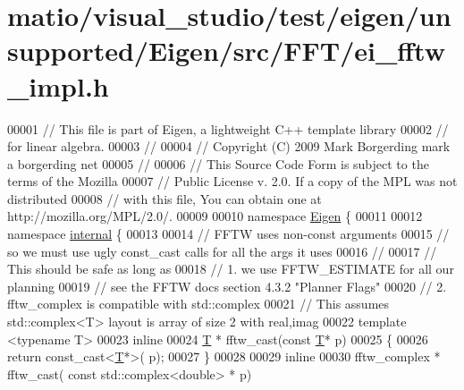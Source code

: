 \hypertarget{matio_2visual__studio_2test_2eigen_2unsupported_2_eigen_2src_2_f_f_t_2ei__fftw__impl_8h_source}{}\section{matio/visual\+\_\+studio/test/eigen/unsupported/\+Eigen/src/\+F\+F\+T/ei\+\_\+fftw\+\_\+impl.h}
\label{matio_2visual__studio_2test_2eigen_2unsupported_2_eigen_2src_2_f_f_t_2ei__fftw__impl_8h_source}

\begin{DoxyCode}
00001 \textcolor{comment}{// This file is part of Eigen, a lightweight C++ template library}
00002 \textcolor{comment}{// for linear algebra. }
00003 \textcolor{comment}{//}
00004 \textcolor{comment}{// Copyright (C) 2009 Mark Borgerding mark a borgerding net}
00005 \textcolor{comment}{//}
00006 \textcolor{comment}{// This Source Code Form is subject to the terms of the Mozilla}
00007 \textcolor{comment}{// Public License v. 2.0. If a copy of the MPL was not distributed}
00008 \textcolor{comment}{// with this file, You can obtain one at http://mozilla.org/MPL/2.0/.}
00009 
00010 \textcolor{keyword}{namespace }\hyperlink{namespace_eigen}{Eigen} \{ 
00011 
00012 \textcolor{keyword}{namespace }\hyperlink{namespaceinternal}{internal} \{
00013 
00014   \textcolor{comment}{// FFTW uses non-const arguments}
00015   \textcolor{comment}{// so we must use ugly const\_cast calls for all the args it uses}
00016   \textcolor{comment}{//}
00017   \textcolor{comment}{// This should be safe as long as }
00018   \textcolor{comment}{// 1. we use FFTW\_ESTIMATE for all our planning}
00019   \textcolor{comment}{//       see the FFTW docs section 4.3.2 "Planner Flags"}
00020   \textcolor{comment}{// 2. fftw\_complex is compatible with std::complex}
00021   \textcolor{comment}{//    This assumes std::complex<T> layout is array of size 2 with real,imag}
00022   \textcolor{keyword}{template} <\textcolor{keyword}{typename} T> 
00023   \textcolor{keyword}{inline} 
00024   \hyperlink{group___sparse_core___module_class_eigen_1_1_triplet}{T} * fftw\_cast(\textcolor{keyword}{const} \hyperlink{group___sparse_core___module_class_eigen_1_1_triplet}{T}* p)
00025   \{ 
00026       \textcolor{keywordflow}{return} \textcolor{keyword}{const\_cast<}\hyperlink{group___sparse_core___module_class_eigen_1_1_triplet}{T}*\textcolor{keyword}{>}( p); 
00027   \}
00028 
00029   \textcolor{keyword}{inline} 
00030   fftw\_complex * fftw\_cast( \textcolor{keyword}{const} std::complex<double> * p)

\end{DoxyCode}
